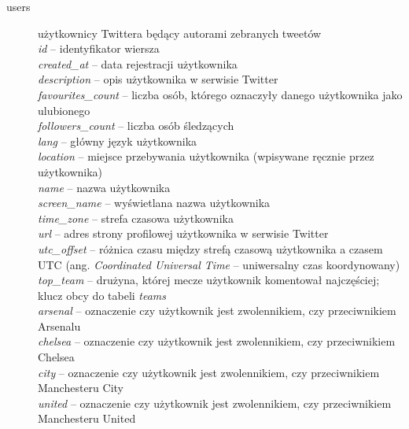 \begin{description}
\item[users] użytkownicy Twittera będący autorami zebranych tweetów\\
\textit{id} -- identyfikator wiersza \\
\textit{created\_at} -- data rejestracji użytkownika\\
\textit{description} -- opis użytkownika w serwisie Twitter\\
\textit{favourites\_count} -- liczba osób, którego oznaczyły danego
użytkownika jako ulubionego\\
\textit{followers\_count} -- liczba osób śledzących\\
\textit{lang} -- główny język użytkownika\\
\textit{location} -- miejsce przebywania użytkownika (wpisywane ręcznie przez
użytkownika)\\
\textit{name} -- nazwa użytkownika\\
\textit{screen\_name} -- wyświetlana nazwa użytkownika\\
\textit{time\_zone} -- strefa czasowa użytkownika\\
\textit{url} -- adres strony profilowej użytkownika w serwisie Twitter\\
\textit{utc\_offset} -- różnica czasu między strefą czasową użytkownika a
czasem UTC (ang. \textit{Coordinated Universal Time} -- uniwersalny czas
koordynowany)\\
\textit{top\_team} -- drużyna, której mecze użytkownik komentował najczęściej;
klucz obcy do tabeli \textit{teams}\\
\textit{arsenal} -- oznaczenie czy użytkownik jest zwolennikiem, czy
przeciwnikiem Arsenalu  \\ 
\textit{chelsea} -- oznaczenie czy użytkownik jest zwolennikiem, czy
przeciwnikiem Chelsea \\
\textit{city} -- oznaczenie czy użytkownik jest zwolennikiem, czy
przeciwnikiem Manchesteru City\\
\textit{united} -- oznaczenie czy użytkownik jest zwolennikiem, czy
przeciwnikiem Manchesteru United
\end{description}
